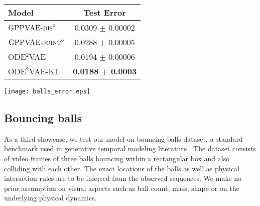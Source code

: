\documentclass{article}
\newcommand{\0}{\mathbf{0}}
\begin{document}
\begin{minipage}[b]{\textwidth}
\begin{minipage}[t]{0.46\textwidth}
\centering
	\label{tab:mnist}
	\vskip 0.05in
	\begin{center}
    \begin{small}
    \begin{sc}
	\begin{tabular}{lc}
		\hline
		 Model & Test Error \\ 
	    \hline
		 $\textsc{GPPVAE-dis}^{\diamond}$ & 0.0309 $\pm$ 0.00002 \\
		 $\textsc{GPPVAE-joint}^{\diamond}$ & 0.0288 $\pm$
0.00005 \\
\textsc{ODE$^2$VAE} & 0.0194 $\pm$ 0.00006 \\
		 \textsc{ODE$^2$VAE-KL} & \textbf{0.0188 $\pm$ 0.0003} \\
        \hline
    \end{tabular}
    \end{sc}
    \end{small}
    \end{center}
\end{minipage}
\hfill
\begin{minipage}[t]{0.46\textwidth}
    \centering
    \strut\vspace*{-\baselineskip}\newline
    \texttt{[image: balls\_error.eps]}
    \vspace*{0.25cm}
    \label{fig:balls_error}
\end{minipage}
\end{minipage}


\subsection{Bouncing balls}
As a third showcase, we test our model on bouncing balls dataset, a standard benchmark used in generative temporal modeling literature \citep{gan2015deep,hsieh2018learning,lotter2015unsupervised}. The dataset consists of video frames of three balls bouncing within a rectangular box and also colliding with each other. The exact locations of the balls as well as physical interaction rules are to be inferred from the observed sequences. We make no prior assumption on visual aspects such as ball count, mass, shape or on the underlying physical dynamics.  
\end{document}
